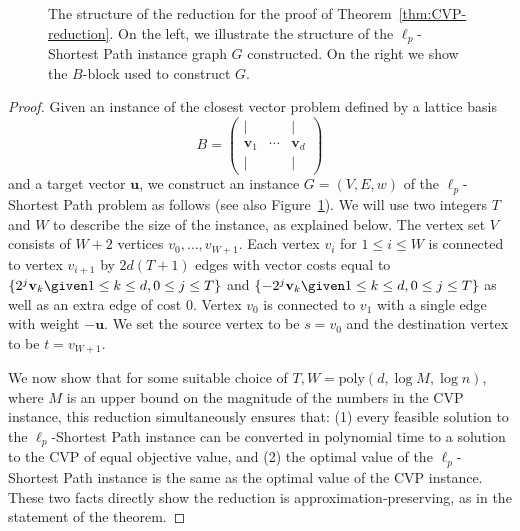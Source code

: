\documentclass[11pt,a4paper]{article}
\begin{document}
\begin{figure}
    \centering
    
    \caption{The structure of the reduction for the proof of Theorem~\ref{thm:CVP-reduction}. On the left, we illustrate the structure of the $\ell_p$-Shortest Path instance graph $G$ constructed. On the right we show the $B$-block used to construct $G$.}
    \label{fig:CVP-reduction}
\end{figure}
\begin{proof}
    Given an instance of the closest vector problem defined by a lattice basis
    \[
        B = \begin{pmatrix}
            | & &|\\
            \mathbf{v}_1& \cdots & \mathbf{v}_d\\
            | & &|
        \end{pmatrix}
    \]
    and a target vector $\mathbf{u}$, we construct an instance $G=(V,E,w)$ of the $\ell_p$-Shortest Path problem as follows (see also Figure~\ref{fig:CVP-reduction}). 
    We will use two integers $T$ and $W$ to describe the size of the instance, as explained below. The vertex set $V$ consists of $W+2$ vertices $v_0, \dots , v_{W+1}$. Each vertex $v_i$ for $1 \le i \le W$ is connected to vertex $v_{i+1}$ by $2d(T+1)$ edges with vector costs equal to $\{2^j\mathbf{v}_k \given 1 \le k \le d, 0 \le j \le T\}$ and $\{-2^j\mathbf{v}_k \given 1 \le k \le d, 0 \le j \le T\}$ as well as an extra edge of cost $0$. Vertex $v_0$ is connected to $v_1$ with a single edge with weight $-\mathbf{u}$.
    We set the source vertex to be \(s = v_0\) and the destination vertex to be \(t = v_{W+1}\).

    We now show that for some suitable choice of $T, W =\text{poly}(d,\log M, \log n)$, where $M$ is an upper bound on the magnitude of the numbers in the CVP instance, this reduction simultaneously ensures that: (1) every feasible solution to the $\ell_p$-Shortest Path instance can be converted in polynomial time to a solution to the CVP of equal objective value, and (2) the optimal value of the $\ell_p$-Shortest Path instance is the same as the optimal value of the CVP instance. These two facts directly show the reduction is approximation-preserving, as in the statement of the theorem.


\end{proof}
\end{document}
